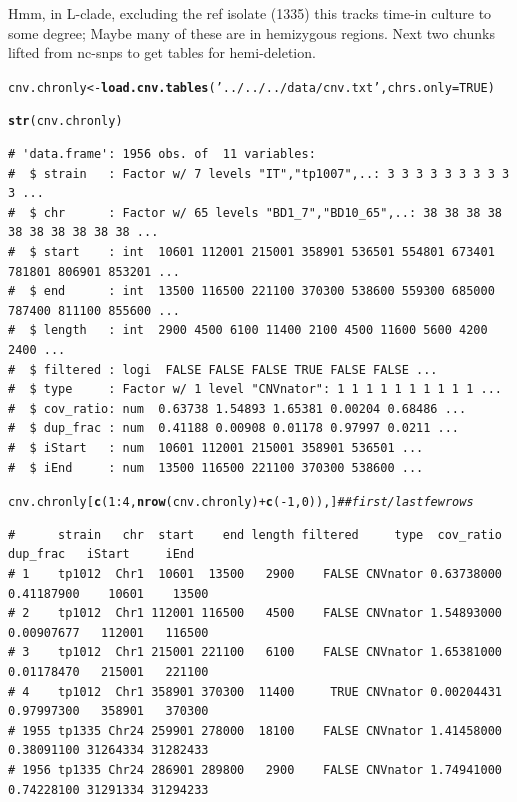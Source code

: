 \documentclass{article}\usepackage[]{graphicx}\usepackage[]{color}
\makeatletter
\newcommand{\hlnum}[1]{\textcolor[rgb]{0.686,0.059,0.569}{#1}}%
\newcommand{\hlstr}[1]{\textcolor[rgb]{0.192,0.494,0.8}{#1}}%
\newcommand{\hlcom}[1]{\textcolor[rgb]{0.678,0.584,0.686}{\textit{#1}}}%
\newcommand{\hlopt}[1]{\textcolor[rgb]{0,0,0}{#1}}%
\newcommand{\hlstd}[1]{\textcolor[rgb]{0.345,0.345,0.345}{#1}}%
\newcommand{\hlkwb}[1]{\textcolor[rgb]{0.69,0.353,0.396}{#1}}%
\newcommand{\hlkwc}[1]{\textcolor[rgb]{0.333,0.667,0.333}{#1}}%
\newcommand{\hlkwd}[1]{\textcolor[rgb]{0.737,0.353,0.396}{\textbf{#1}}}%
\newenvironment{kframe}{%
 \def\at@end@of@kframe{}%
 \ifinner\ifhmode%
  \def\at@end@of@kframe{\end{minipage}}%
  \begin{minipage}{\columnwidth}%
 \fi\fi%
 \def\FrameCommand##1{\hskip\@totalleftmargin \hskip-\fboxsep
 \colorbox{shadecolor}{##1}\hskip-\fboxsep
     \hskip-\linewidth \hskip-\@totalleftmargin \hskip\columnwidth}%
 \MakeFramed {\advance\hsize-\width
   \@totalleftmargin\z@ \linewidth\hsize
   \@setminipage}}%
 {\par\unskip\endMakeFramed%
 \at@end@of@kframe}
\newenvironment{knitrout}{}{} %
\makeatother
\begin{document}
Hmm, in L-clade, excluding the ref isolate (1335) this tracks time-in culture to some degree;  Maybe many of these are in hemizygous regions.  Next two chunks lifted from nc-snps to get tables for hemi-deletion.

\begin{knitrout}\footnotesize
{}\color{fgcolor}\begin{kframe}
\begin{alltt}
\hlstd{cnv.chronly} \hlkwb{<-} \hlkwd{load.cnv.tables}\hlstd{(}\hlstr{'../../../data/cnv.txt'}\hlstd{,} \hlkwc{chrs.only}\hlstd{=}\hlnum{TRUE}\hlstd{)}

\hlkwd{str}\hlstd{(cnv.chronly)}
\end{alltt}
\begin{verbatim}
# 'data.frame':	1956 obs. of  11 variables:
#  $ strain   : Factor w/ 7 levels "IT","tp1007",..: 3 3 3 3 3 3 3 3 3 3 ...
#  $ chr      : Factor w/ 65 levels "BD1_7","BD10_65",..: 38 38 38 38 38 38 38 38 38 38 ...
#  $ start    : int  10601 112001 215001 358901 536501 554801 673401 781801 806901 853201 ...
#  $ end      : int  13500 116500 221100 370300 538600 559300 685000 787400 811100 855600 ...
#  $ length   : int  2900 4500 6100 11400 2100 4500 11600 5600 4200 2400 ...
#  $ filtered : logi  FALSE FALSE FALSE TRUE FALSE FALSE ...
#  $ type     : Factor w/ 1 level "CNVnator": 1 1 1 1 1 1 1 1 1 1 ...
#  $ cov_ratio: num  0.63738 1.54893 1.65381 0.00204 0.68486 ...
#  $ dup_frac : num  0.41188 0.00908 0.01178 0.97997 0.0211 ...
#  $ iStart   : num  10601 112001 215001 358901 536501 ...
#  $ iEnd     : num  13500 116500 221100 370300 538600 ...
\end{verbatim}
\begin{alltt}
\hlstd{cnv.chronly[}\hlkwd{c}\hlstd{(}\hlnum{1}\hlopt{:}\hlnum{4}\hlstd{,}\hlkwd{nrow}\hlstd{(cnv.chronly)}\hlopt{+}\hlkwd{c}\hlstd{(}\hlopt{-}\hlnum{1}\hlstd{,}\hlnum{0}\hlstd{)),]}                     \hlcom{## first/last few rows}
\end{alltt}
\begin{verbatim}
#      strain   chr  start    end length filtered     type  cov_ratio   dup_frac   iStart     iEnd
# 1    tp1012  Chr1  10601  13500   2900    FALSE CNVnator 0.63738000 0.41187900    10601    13500
# 2    tp1012  Chr1 112001 116500   4500    FALSE CNVnator 1.54893000 0.00907677   112001   116500
# 3    tp1012  Chr1 215001 221100   6100    FALSE CNVnator 1.65381000 0.01178470   215001   221100
# 4    tp1012  Chr1 358901 370300  11400     TRUE CNVnator 0.00204431 0.97997300   358901   370300
# 1955 tp1335 Chr24 259901 278000  18100    FALSE CNVnator 1.41458000 0.38091100 31264334 31282433
# 1956 tp1335 Chr24 286901 289800   2900    FALSE CNVnator 1.74941000 0.74228100 31291334 31294233
\end{verbatim}
\end{kframe}
\end{knitrout}
\end{document}
